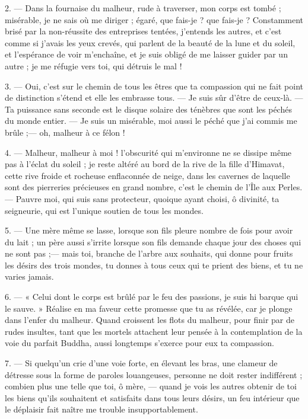 \documentclass[a4paper, 11pt, oneside, french]{article}
\begin{document}
2. --- Dans la fournaise du malheur, rude à traverser, mon corps est tombé ; misérable, je ne sais où me diriger ; égaré, que fais-je ? que fais-je ? Constamment brisé par la non-réussite des entreprises tentées, j'entends les autres, et c'est comme si j'avais les yeux crevés, qui parlent de la beauté de la lune et du soleil, et l'espérance de voir m'enchaîne, et je suis obligé de me laisser guider par un autre ; je me réfugie vers toi, qui détruis le mal !

3. --- Oui, c'est sur le chemin de tous les êtres que ta compassion qui ne fait point de distinction s'étend et elle les embrasse tous. --- Je suis sûr d'être de ceux-là. --- Ta puissance sans seconde est le disque solaire des ténèbres que sont les péchés du monde entier. --- Je suis un misérable, moi aussi le péché que j'ai commis me brûle ;--- oh, malheur à ce félon !

4. --- Malheur, malheur à moi ! l'obscurité qui m'environne ne se dissipe même pas à l'éclat du soleil ; je reste altéré au bord de la rive de la fille d'Himavat, cette rive froide et rocheuse enflaconnée de neige, dans les cavernes de laquelle sont des pierreries précieuses en grand nombre, c'est le chemin de l'Île aux Perles. --- Pauvre moi, qui suis sans protecteur, quoique ayant choisi, ô divinité, ta seigneurie, qui est l'unique soutien de tous les mondes.

5. --- Une mère même se lasse, lorsque son fils pleure nombre de fois pour avoir du lait ; un père aussi s'irrite lorsque son fils demande chaque jour des choses qui ne sont pas ;--- mais toi, branche de l'arbre aux souhaits, qui donne pour fruits les désirs des trois mondes, tu donnes à tous ceux qui te prient des biens, et tu ne varies jamais.

6. --- « Celui dont le corps est brûlé par le feu des passions, je suis hi barque qui le sauve. » Réalise en ma faveur cette promesse que tu as révélée, car je plonge dans l'enfer du malheur. Quand croissent les flots du malheur, pour finir par de rudes insultes, tant que les mortels attachent leur pensée à la contemplation de la voie du parfait Buddha, aussi longtemps s'exerce pour eux ta compassion.

7. --- Si quelqu'un crie d'une voie forte, en élevant les bras, une clameur de détresse sous la forme de paroles louangeuses, personne ne doit rester indifférent ; combien plus une telle que toi, ô mère, --- quand je vois les autres obtenir de toi les biens qu'ils souhaitent et satisfaits dans tous leurs désirs, un feu intérieur que le déplaisir fait naître me trouble insupportablement.
\end{document}
